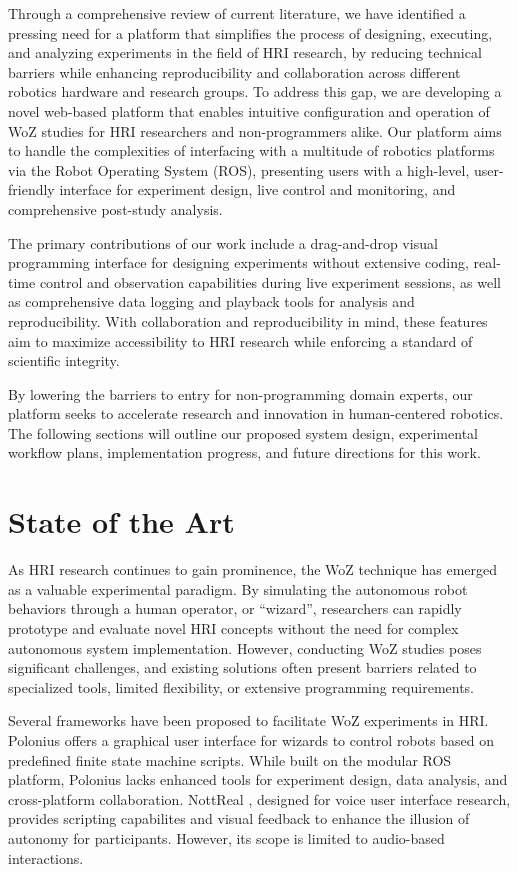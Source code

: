\documentclass[letterpaper, 10 pt, conference]{ieeeconf}
\begin{document}
Through a comprehensive review of current literature, we have identified a pressing need for a platform that simplifies the process of designing, executing, and analyzing experiments in the field of HRI research, by reducing technical barriers while enhancing reproducibility and collaboration across different robotics hardware and research groups. To address this gap, we are developing a novel web-based platform that enables intuitive configuration and operation of WoZ studies for HRI researchers and non-programmers alike. Our platform aims to handle the complexities of interfacing with a multitude of robotics platforms via the Robot Operating System (ROS), presenting users with a high-level, user-friendly interface for experiment design, live control and monitoring, and comprehensive post-study analysis.

The primary contributions of our work include a drag-and-drop visual programming interface for designing experiments without extensive coding, real-time control and observation capabilities during live experiment sessions, as well as comprehensive data logging and playback tools for analysis and reproducibility. With collaboration and reproducibility in mind, these features aim to maximize accessibility to HRI research while enforcing a standard of scientific integrity.

By lowering the barriers to entry for non-programming domain experts, our platform seeks to accelerate research and innovation in human-centered robotics. The following sections will outline our proposed system design, experimental workflow plans, implementation progress, and future directions for this work.


\section{State of the Art}

As HRI research continues to gain prominence, the WoZ technique has emerged as a valuable experimental paradigm. By simulating the autonomous robot behaviors through a human operator, or ``wizard'', researchers can rapidly prototype and evaluate novel HRI concepts without the need for complex autonomous system implementation. However, conducting WoZ studies poses significant challenges, and existing solutions often present barriers related to specialized tools, limited flexibility, or extensive programming requirements.

Several frameworks have been proposed to facilitate WoZ experiments in HRI. Polonius \cite{Lu2011} offers a graphical user interface for wizards to control robots based on predefined finite state machine scripts. While built on the modular ROS platform, Polonius lacks enhanced tools for experiment design, data analysis, and cross-platform collaboration. NottReal \cite{Porcheron2020}, designed for voice user interface research, provides scripting capabilites and visual feedback to enhance the illusion of autonomy for participants. However, its scope is limited to audio-based interactions.
\end{document}
